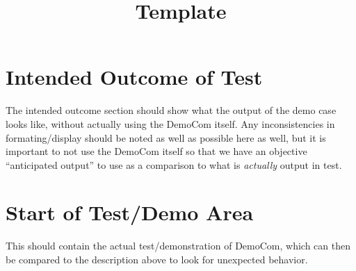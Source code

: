 
\section{Intended Outcome of Test}

The intended outcome section should show what the output of the demo case looks like, without actually using the DemoCom itself.
Any inconsistencies in formating/display should be noted as well as possible here as well, but it is important to not use the 
DemoCom itself so that we have an objective ``anticipated output'' to use as a comparison to what is \textit{actually} output in
test. 

\section{Start of Test/Demo Area}

This should contain the actual test/demonstration of DemoCom, which can then be compared to the description above to look for 
unexpected behavior.

\hrulefill





\documentclass{ximera}
\title{Template}


\begin{abstract}
    
\end{abstract}
\maketitle

{{\Huge \bfseries Last Updated: \today}} \\


\section{Basic Usage}


\section{Intended Outcome of Test}


\section{Start of Test/Demo Area}


\hrulefill



